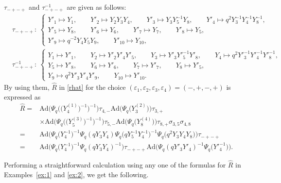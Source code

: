 \documentclass[pdftex]{sigma}
\numberwithin{equation}{section}
\begin{document}
\begin{Example}\label{ex:2}
$\tau_{-+-+}$ and $\tau_{-+-+}^{-1}$ are given as follows:
\begin{align*}
&\tau_{-+-+}\colon\
\begin{cases}
Y'_1 \mapsto Y_1,\qquad
Y'_2 \mapsto Y_2Y_3Y_4, \qquad
Y'_3 \mapsto Y_3Y^{-1}_5Y_8, \qquad
Y'_4 \mapsto q^2Y^{-1}_3Y^{-1}_4Y^{-1}_8,
\\
Y'_5 \mapsto Y_8, \qquad
Y'_6 \mapsto Y_6,\qquad
Y'_7 \mapsto Y_7,\qquad
Y'_8 \mapsto Y_5,
\\
Y'_9 \mapsto q^{-2}Y_4Y_5Y_9, \qquad
Y'_{10} \mapsto Y_{10},
\end{cases}
\\
& \tau_{-+-+}^{-1}\colon\
\begin{cases}
Y_1 \mapsto Y'_1, \qquad\!
Y_2 \mapsto Y'_2Y'_4Y'_5, \qquad\!
Y_3 \mapsto Y'_3Y'^{-1}_5Y'_8, \qquad\!
Y_4 \mapsto q^2Y'^{-1}_3Y'^{-1}_4Y'^{-1}_8,
\\
Y_5 \mapsto Y'_8, \qquad
Y_6 \mapsto Y'_6, \qquad
Y_7 \mapsto Y'_7, \qquad
Y_8 \mapsto Y'_5,
\\
Y_9 \mapsto q^2Y'_3Y'_4Y'_9, \qquad
Y_{10} \mapsto Y'_{10}.
\end{cases}
\end{align*}
By using them, $\widehat{R}$ in \eqref{rhat} for the choice
$(\varepsilon_1, \varepsilon_2, \varepsilon_3, \varepsilon_4)=(-,+,-,+)$
is expressed as
\begin{align}
\widehat{R}={}&
\mathrm{Ad}\bigl(\Psi_q\bigl(\bigl(Y^{(1)}_4\bigr)^{-1}\bigr)^{-1}\bigr)\tau_{4,-}
\mathrm{Ad}\bigl(\Psi_q\bigl(Y^{(2)}_3\bigr)\bigr)\tau_{3,+}
\nonumber \\
& \times
\mathrm{Ad}\bigl(\Psi_q\bigl(\bigl(Y^{(3)}_5\bigr)^{-1}\bigr)^{-1}\bigr)\tau_{5,-}
\mathrm{Ad}\bigl(\Psi_q\bigl(Y^{(4)}_8\bigr)\bigr)\tau_{8,+}\sigma_{3,5}\sigma_{4,8}
\nonumber \\
={}&
\mathrm{Ad}\bigl(\Psi_q\bigl(Y_4^{-1}\bigr)^{-1}
\Psi_q(qY_3Y_4)
\Psi_q\bigl(qY^{-1}_5Y^{-1}_4\bigr)^{-1}
\Psi_q\bigl(q^2Y_3Y_4Y_8\bigr)\bigr)\tau_{-+-+}
\label{dode1}\\
={}&
\mathrm{Ad}\bigl(
\Psi_q\bigl(Y_4^{-1}\bigr)^{-1}
\Psi_q(qY_3Y_4)^{-1}\bigr)
\tau_{-+-+}
\mathrm{Ad}\bigl(
\Psi_q(qY'_3Y'_4)^{-1}
\Psi_q\bigl(Y'^{-1}_4\bigr)\bigr).
\label{dode2}
\end{align}
\end{Example}

Performing a straightforward calculation using any one
of the formulas for $\widehat{R}$ in Examples~\ref{ex:1} and \ref{ex:2},
we get the following.
\end{document}
